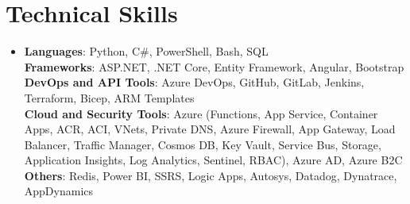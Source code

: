 \documentclass[letterpaper,10pt]{article}
\newcommand{\sectionspace}{\vspace{-20pt}}
\newcommand{\subheadingtitlevspace}{\vspace{-3pt}}
\newcommand{\titleItem}[1]{\textbf{#1}}
\begin{document}
\section{Technical Skills}
\subheadingtitlevspace
\begin{itemize}[leftmargin=0.15in, label={}]
  \item{\titleItem{Languages}{: Python, C\#, PowerShell, Bash, SQL} \\
        \titleItem{Frameworks}{: ASP.NET, .NET Core, Entity Framework, Angular, Bootstrap} \\
        \titleItem{DevOps and API Tools}{: Azure DevOps, GitHub, GitLab, Jenkins, Terraform, Bicep, ARM Templates} \\
        \titleItem{Cloud and Security Tools}{: Azure (Functions, App Service, Container Apps, ACR, ACI, VNets, Private DNS, Azure Firewall, App Gateway, Load Balancer, Traffic Manager, Cosmos DB, Key Vault, Service Bus, Storage, Application Insights, Log Analytics, Sentinel, RBAC), Azure AD, Azure B2C} \\
        \titleItem{Others}{: Redis, Power BI, SSRS, Logic Apps, Autosys, Datadog, Dynatrace, AppDynamics}}
\end{itemize}
\sectionspace

\end{document}
